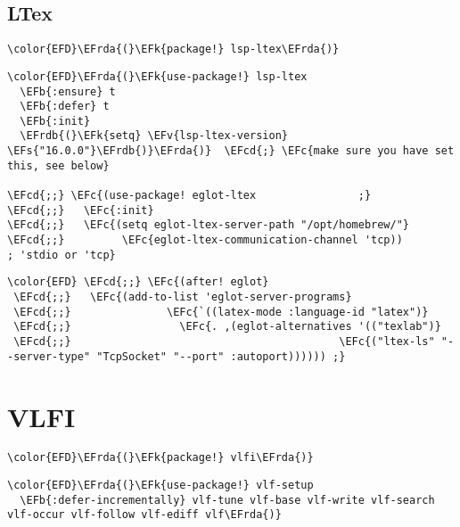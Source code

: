 \documentclass[12pt]{article}
\theoremstyle{plain}%
\theoremstyle{definition}
\theoremstyle{remark}
\newcommand{\EFc}[1]{\textcolor{EFc}{#1}} %
\newcommand{\EFcd}[1]{\textcolor{EFcd}{#1}} %
\newcommand{\EFs}[1]{\textcolor{EFs}{#1}} %
\newcommand{\EFk}[1]{\textcolor{EFk}{#1}} %
\newcommand{\EFb}[1]{\textcolor{EFb}{#1}} %
\newcommand{\EFv}[1]{\textcolor{EFv}{#1}} %
\newcommand{\EFrda}[1]{\textcolor{EFrda}{#1}} %
\newcommand{\EFrdb}[1]{\textcolor{EFrdb}{#1}} %
\begin{document}
\subsection{LTex}
\label{sec:orgfc98cc6}
\begin{Code}
\begin{Verbatim}
\color{EFD}\EFrda{(}\EFk{package!} lsp-ltex\EFrda{)}
\end{Verbatim}
\end{Code}
\begin{Code}
\begin{Verbatim}
\color{EFD}\EFrda{(}\EFk{use-package!} lsp-ltex
  \EFb{:ensure} t
  \EFb{:defer} t
  \EFb{:init}
  \EFrdb{(}\EFk{setq} \EFv{lsp-ltex-version} \EFs{"16.0.0"}\EFrdb{)}\EFrda{)}  \EFcd{;} \EFc{make sure you have set this, see below}

\EFcd{;;} \EFc{(use-package! eglot-ltex                ;}
\EFcd{;;}   \EFc{:init}
\EFcd{;;}   \EFc{(setq eglot-ltex-server-path "/opt/homebrew/"}
\EFcd{;;}         \EFc{eglot-ltex-communication-channel 'tcp))         ; 'stdio or 'tcp}
\end{Verbatim}
\end{Code}
\begin{Code}
\begin{Verbatim}
\color{EFD} \EFcd{;;} \EFc{(after! eglot}
 \EFcd{;;}   \EFc{(add-to-list 'eglot-server-programs}
 \EFcd{;;}               \EFc{`((latex-mode :language-id "latex")}
 \EFcd{;;}                 \EFc{. ,(eglot-alternatives '(("texlab")}
 \EFcd{;;}                                          \EFc{("ltex-ls" "--server-type" "TcpSocket" "--port" :autoport)))))) ;}
\end{Verbatim}
\end{Code}
\section{VLFI}
\label{sec:orgcfcf0d6}
\begin{Code}
\begin{Verbatim}
\color{EFD}\EFrda{(}\EFk{package!} vlfi\EFrda{)}
\end{Verbatim}
\end{Code}
\begin{Code}
\begin{Verbatim}
\color{EFD}\EFrda{(}\EFk{use-package!} vlf-setup
  \EFb{:defer-incrementally} vlf-tune vlf-base vlf-write vlf-search vlf-occur vlf-follow vlf-ediff vlf\EFrda{)}
\end{Verbatim}
\end{Code}
\end{document}
